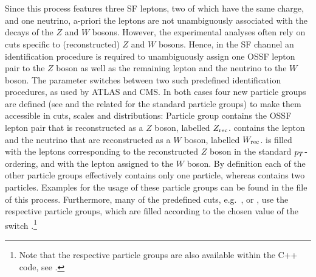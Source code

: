 \documentclass[english,11pt]{article}
\begin{document}
\\
\\
\\
\\
\\
\\
\\
\\
\\
\\
\\
\\

Since this process features three SF leptons, two of which have the same charge, and one neutrino, a-priori the leptons
are not unambiguously associated with the decays of the $Z$ and $W$ bosons. However, the experimental analyses 
often rely on cuts specific to (reconstructed) $Z$ and $W$ bosons. Hence, in the SF channel an identification procedure is required to
unambiguously assign one OSSF lepton pair to the $Z$ boson as well as the remaining lepton and the neutrino to the 
$W$ boson. The parameter  
switches between two such predefined identification procedures, as used by ATLAS and CMS. 
In both cases four new particle groups are defined (see  and the related  
for the standard particle groups) to make them accessible in cuts, scales and distributions: 
Particle group  contains the OSSF lepton pair that is reconstructed as a $Z$ boson, labelled $Z_{\rm rec}$. 
 contains the lepton and the neutrino that are reconstructed as a $W$ boson, labelled $W_{\rm rec}$. 
 is filled with the leptons corresponding to the reconstructed $Z$ boson in the standard $p_T$-ordering, and  with the lepton assigned to the $W$ boson.
By definition each of the other particle groups effectively contains only one particle, whereas  contains two particles. Examples for the usage of these particle groups can be found in 
the file  of this process. Furthermore, many of the predefined cuts, e.g.\ , 
 or , use 
the respective particle groups, which are filled according to the chosen value of the switch .\footnote{Note that the respective 
particle groups are also available within the C++ code, see .}
\end{document}
